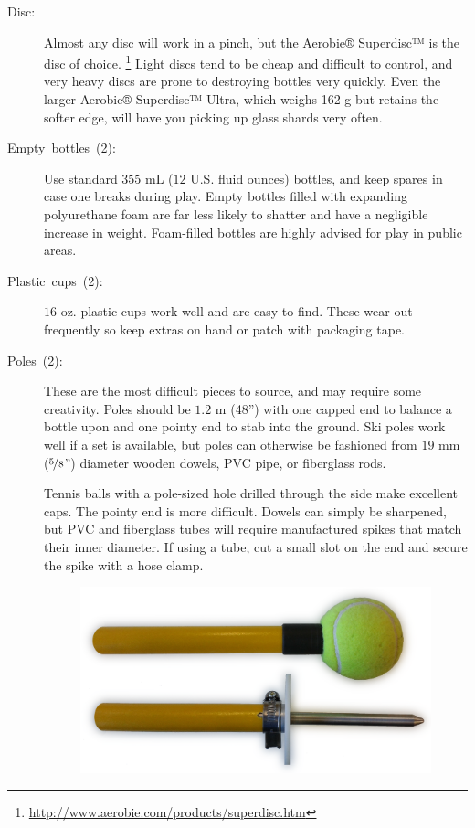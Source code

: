 \documentclass[11pt,letterpaper,twocolumn,english,DIV=calc]{scrartcl}
\begin{document}
\begin{description}
	\item [{Disc:}] 
		Almost any disc will work in a pinch, but the Aerobie® Superdisc™ is the disc of choice.%
		\footnote{\url{http://www.aerobie.com/products/superdisc.htm}}
		Light discs tend to be cheap and difficult to control, and very heavy discs are prone to destroying bottles very quickly. 
		Even the larger Aerobie® Superdisc™ Ultra, which weighs 162 g but retains the softer edge, will have you picking up glass shards very often.
	\item [{Empty~bottles~(2):}] 
		Use standard $355\mbox{ mL}$ ($12$ U.S. fluid ounces) bottles, and keep spares in case one breaks during play.
		Empty bottles filled with expanding polyurethane foam are far less likely to shatter and have a negligible increase in weight. 
		Foam-filled bottles are highly advised for play in public areas.
	\item [{Plastic~cups~(2):}] 
		$16\mbox{ oz.}$ plastic cups work well and are easy to find. 
		These wear out frequently so keep extras on hand or patch with packaging tape.
	\item [{Poles~(2):}] 
		These are the most difficult pieces to source, and may require some creativity. 
		Poles should be $1.2\mbox{ m}$ (48'') with one capped end to balance a bottle upon and one pointy end to stab into the ground. 
		Ski poles work well if a set is available, but poles can otherwise be fashioned from $19\mbox{ mm}$ ($\nicefrac{5}{8}$'') diameter wooden dowels, PVC pipe, or fiberglass rods. 

		Tennis balls with a pole-sized hole drilled through the side make excellent caps. 
		The pointy end is more difficult. 
		Dowels can simply be sharpened, but PVC and fiberglass tubes will require manufactured spikes that match their inner diameter. 
		If using a tube, cut a small slot on the end and secure the spike with a hose clamp.

		\begin{figure}[!h]
			\centering{}
			\includegraphics[width=0.8\columnwidth]{images/pole_ends-w}
		\end{figure}


\end{description}
\end{document}
